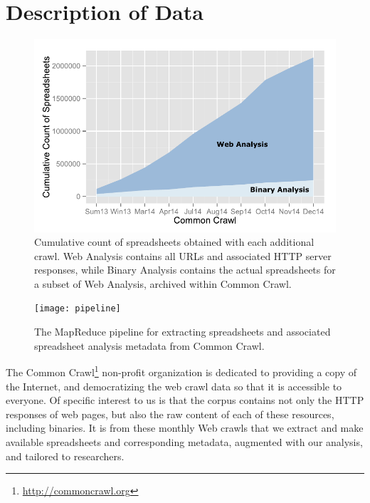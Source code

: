 \documentclass[conference]{IEEEtran}
\begin{document}
\section{Description of Data}

\begin{figure}[!t]
\centering
% 
\includegraphics[width=\columnwidth]{figures/stack}
\caption{Cumulative count of spreadsheets obtained with each additional crawl. Web Analysis contains all URLs and associated HTTP server responses, while Binary Analysis contains the actual spreadsheets for a subset of Web Analysis, archived within Common Crawl.\label{fig:rplot}}
\end{figure}

\begin{figure}[!t]
\centering
\texttt{[image: pipeline]}
\caption{The MapReduce pipeline for extracting spreadsheets and associated spreadsheet analysis metadata from Common Crawl.\label{fig:mrpipeline}}
\end{figure}


The Common Crawl\footnote{\url{http://commoncrawl.org}} non-profit organization is dedicated to providing a copy of the Internet, and democratizing the web crawl data so that it is accessible to everyone. 
%
Of specific interest to us is that the corpus contains not only the HTTP responses of web pages, but also the raw content of each of these resources, including binaries. It is from these monthly Web crawls that we extract and make available spreadsheets and corresponding metadata, augmented with our analysis, and tailored to researchers.
\end{document}
